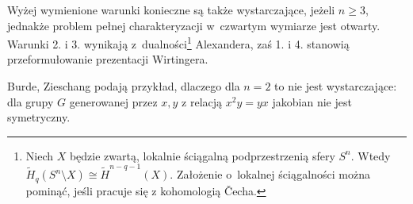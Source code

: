 Wyżej wymienione warunki konieczne są także wystarczające, jeżeli $n \ge 3$, jednakże problem pełnej charakteryzacji w~czwartym wymiarze jest otwarty.
Warunki 2. i 3. wynikają z~dualności\footnote{Niech $X$ będzie zwartą, lokalnie ściągalną podprzestrzenią sfery $S^n$. Wtedy $\tilde {H}_{q}(S^n \setminus X) \cong \tilde H^{n-q-1}(X)$. Założenie o~lokalnej ściągalności można pominąć, jeśli pracuje się z kohomologią Čecha.} Alexandera, zaś 1. i 4. stanowią przeformułowanie prezentacji Wirtingera.

Burde, Zieschang \cite[s. 180]{burde2014} podają przykład, dlaczego dla $n = 2$ to nie jest wystarczające: dla grupy $G$ generowanej przez $x, y$ z relacją $x^2y = yx$ jakobian nie jest symetryczny.

%
